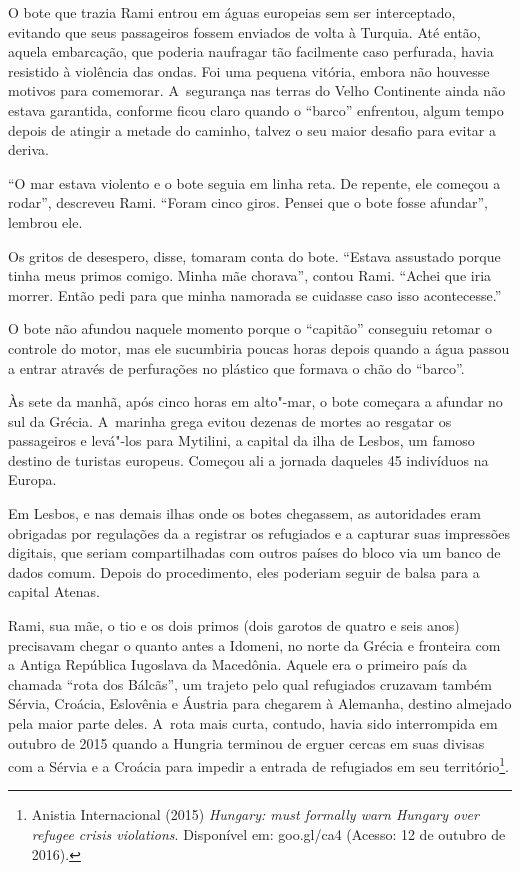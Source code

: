 O bote que trazia Rami entrou em águas europeias sem ser interceptado,
evitando que seus passageiros fossem enviados de volta à Turquia. Até
então, aquela embarcação, que poderia naufragar tão facilmente caso
perfurada, havia resistido à violência das ondas. Foi uma pequena
vitória, embora não houvesse motivos para comemorar. A~segurança nas
terras do Velho Continente ainda não estava garantida, conforme ficou
claro quando o ``barco'' enfrentou, algum tempo depois de atingir a
metade do caminho, talvez o seu maior desafio para evitar a deriva.

``O mar estava violento e o bote seguia em linha reta. De repente, ele
começou a rodar'', descreveu Rami. ``Foram cinco giros. Pensei que o
bote fosse afundar'', lembrou ele.

Os gritos de desespero, disse, tomaram conta do bote. ``Estava assustado
porque tinha meus primos comigo. Minha mãe chorava'', contou Rami.
``Achei que iria morrer. Então pedi para que minha namorada se cuidasse
caso isso acontecesse.''

O bote não afundou naquele momento porque o ``capitão'' conseguiu
retomar o controle do motor, mas ele sucumbiria poucas horas depois
quando a água passou a entrar através de perfurações no plástico que
formava o chão do ``barco''.

Às sete da manhã, após cinco horas em alto"-mar, o bote começara a
afundar no sul da Grécia. A~marinha grega evitou dezenas de mortes ao
resgatar os passageiros e levá"-los para Mytilini, a capital da ilha de
Lesbos, um famoso destino de turistas europeus. Começou ali a jornada
daqueles 45 indivíduos na Europa.

Em Lesbos, e nas demais ilhas onde os botes chegassem, as autoridades
eram obrigadas por regulações da  a registrar os refugiados e a
capturar suas impressões digitais, que seriam compartilhadas com outros
países do bloco via um banco de dados comum. Depois do procedimento,
eles poderiam seguir de balsa para a capital Atenas.

Rami, sua mãe, o tio e os dois primos (dois garotos de quatro e seis
anos) precisavam chegar o quanto antes a Idomeni, no norte da Grécia e
fronteira com a Antiga República Iugoslava da Macedônia. Aquele era o
primeiro país da chamada ``rota dos Bálcãs'', um trajeto pelo qual
refugiados cruzavam também Sérvia, Croácia, Eslovênia e Áustria para
chegarem à Alemanha, destino almejado pela maior parte deles. A~rota
mais curta, contudo, havia sido interrompida em outubro de 2015 quando a
Hungria terminou de erguer cercas em suas divisas com a Sérvia e a
Croácia para impedir a entrada de refugiados em seu
território\footnote{ Anistia Internacional (2015) \emph{Hungary:  must
formally warn Hungary over refugee crisis violations}. Disponível em:
goo.gl/ca4
(Acesso: 12 de outubro de 2016).}.

